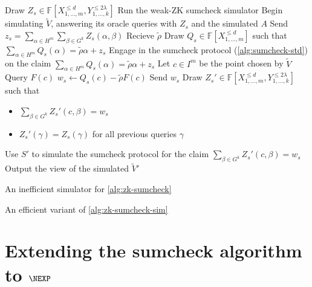 \documentclass[english,12pt]{reedthesis}
\theoremstyle{plain}
\theoremstyle{definition}
\theoremstyle{remark}
\begin{document}
\begin{algorithm}[htbp]
  Draw $Z_{s} \in \mathbb{F}[X_{1, \ldots, m}^{\le d}, Y_{1, \ldots, k}^{\le 2\lambda}]$\;
  Run the weak-ZK sumcheck simulator\; %
  Begin simulating $\tilde{V}$, answering its oracle queries with $Z_{s}$ and
  the simulated $A$\;
  Send $z_{s} = \sum_{\alpha \in H^{m}}\sum_{\beta \in G^{k}}Z_{s}(\alpha, \beta)$\;
  Recieve $\tilde{\rho}$\; %
  Draw $Q_{s} \in \mathbb{F}[X_{1, \ldots, m}^{\le d}]$ such that
  $\sum_{\alpha \in H^{m}}Q_{s}(\alpha) = \tilde{\rho}\alpha + z_{s}$\;
  Engage in the sumcheck protocol (\cref{alg:sumcheck-std}) on the claim
  $\sum_{\alpha \in H^{m}}Q_{s}(\alpha) = \tilde{\rho}\alpha + z_{s}$\;
  Let $c \in I^{m}$ be the point chosen by $\tilde{V}$\;
  Query $F(c)$\;
  $w_{s} \leftarrow Q_{s}(c) - \tilde{\rho}F(c)$\;
  Send $w_{s}$\;
  Draw $Z_{s}' \in \mathbb{F}[X_{1, \ldots, m}^{\le d}, Y_{1, \ldots, k}^{\le 2\lambda}]$ such that
  \begin{itemize}
    \item $\sum_{\beta \in G^{k}}Z_{s}'(c, \beta) = w_{s}$
    \item $Z_{s}'(\gamma) = Z_{s}(\gamma)$ for all previous queries $\gamma$\;
  \end{itemize}
  Use $S'$ to simulate the sumcheck protocol for the claim
  $\sum_{\beta \in G^{k}}Z_{s}'(c, \beta) = w_{s}$\;
  Output the view of the simulated $\tilde{V}'$\;
  \caption{An inefficient simulator for
    \cref{alg:zk-sumcheck}~\cite[p.\ 15:33]{CFGS22}}\label{alg:zk-sumcheck-sim}
\end{algorithm}

\begin{algorithm}[htbp]
  \caption{An efficient variant of
    \cref{alg:zk-sumcheck-sim}~\cite[p.\ 15:34]{CFGS22}}\label{alg:zk-sumcheck-fast}
\end{algorithm}


\section{Extending the sumcheck algorithm to $\NEXP$}

\end{document}
